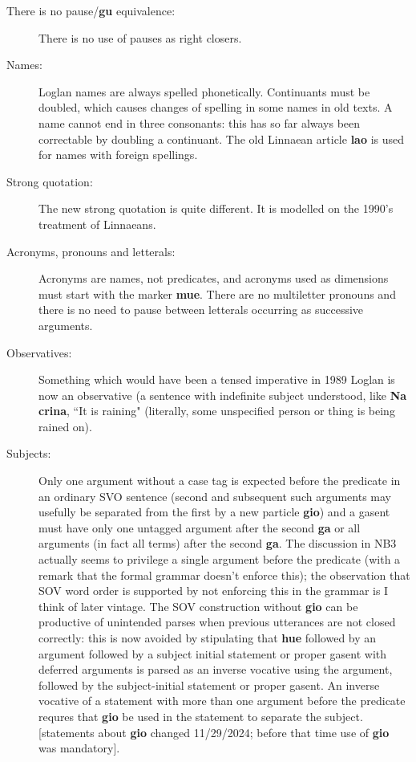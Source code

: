 \documentclass[12pt]{book}
\begin{document}
\begin{description}

\item[There is no pause/{\bf gu} equivalence:]  There is no use of pauses as right closers.  


\item[Names:]  Loglan names are always spelled phonetically.  Continuants must be doubled, which causes changes of spelling in some names in old texts.
A name cannot end in three consonants:  this has so far always been correctable by doubling a continuant.  The old Linnaean article {\bf lao} is used for names with foreign spellings.

\item[Strong quotation:]  The new strong quotation is quite different.   It is modelled on the 1990's treatment of Linnaeans.

\item[Acronyms, pronouns and letterals:]   Acronyms are names, not predicates, and acronyms used as dimensions must start with the marker {\bf mue}.  There are no multiletter pronouns and there is no need to pause between letterals occurring as successive arguments.


\item[Observatives:]   Something which would have been a tensed imperative in 1989 Loglan is now an observative (a sentence with indefinite subject understood, like {\bf Na crina}, ``It is raining" (literally, some unspecified person or thing is being rained on).

\item[Subjects:]  Only one argument without a case tag is expected before the predicate in an ordinary SVO sentence (second and subsequent such arguments may usefully be separated from the first by a new particle {\bf gio}) and a gasent must have only one untagged argument after the second {\bf ga} or all arguments (in fact all terms) after the second {\bf ga}.  The discussion in NB3 actually seems to privilege a single argument before the predicate (with a remark that the formal grammar doesn't enforce this);  the observation that SOV word order is supported by not enforcing this in the grammar is I think of later vintage.  The SOV construction without {\bf gio} can be productive of unintended parses when previous utterances are not closed correctly:  this is now avoided by stipulating that {\bf hue} followed by an argument followed by a subject initial statement or proper gasent with deferred arguments is parsed as an inverse vocative using the argument, followed by the subject-initial statement or proper gasent.  An inverse vocative of a statement with more than one argument before the predicate requres that {\bf gio} be used in the statement to separate the subject.  [statements about {\bf gio} changed 11/29/2024;  before that time use of {\bf gio} was mandatory].


\end{description}
\end{document}
